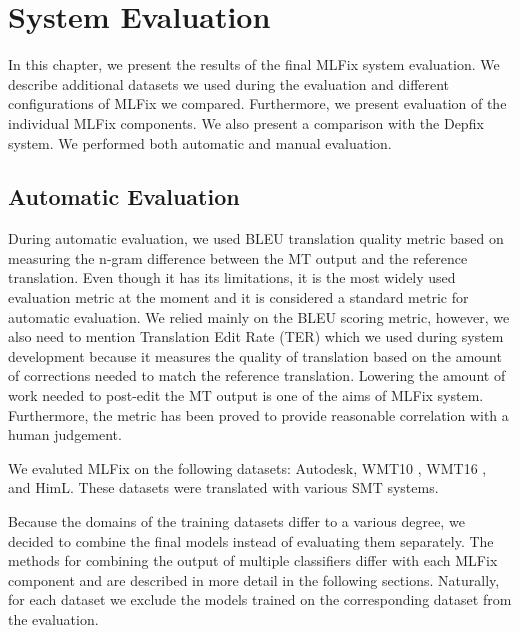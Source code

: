 \chapter{System Evaluation}
\label{chap:eval}

In this chapter, we present the results of the final MLFix system evaluation.
We describe additional datasets we used during the evaluation and different
configurations of MLFix we compared. Furthermore, we present evaluation
of the individual MLFix components.
We also present a comparison with the Depfix
system. We performed both automatic and manual evaluation.

\section{Automatic Evaluation}

During automatic evaluation, we used BLEU \citep{papineni:2002} translation
quality metric based on measuring the n-gram difference between the MT output
and the reference translation.
Even though it has its limitations, it is the most widely used
evaluation metric at the moment and it is considered a standard metric for automatic evaluation.
We relied mainly on the BLEU scoring metric, however, we also need to mention
Translation Edit Rate (TER) \citep{Snover06astudy} which we used during system development because it measures
the quality of translation based on the amount of corrections needed to match
the reference translation. Lowering the amount of work needed to post-edit the MT output
is one of the aims of MLFix system. Furthermore, the metric has been proved to provide
reasonable correlation with a human judgement.

We evaluted MLFix on the following datasets: Autodesk, WMT10\linebreak
\citep{callisonburch-EtAl:2010:WMT}, WMT16 \citep{bojar-EtAl:2016:WMT1}, and HimL.
These datasets
were translated with various SMT systems.

Because the domains of the training datasets differ to a various degree,
we decided to combine the final models instead of evaluating them separately.
The methods for combining the output of multiple classifiers
differ with each MLFix component and are described in more detail in the following
sections.
Naturally, for each dataset we exclude the models trained on the corresponding dataset from
the evaluation.


